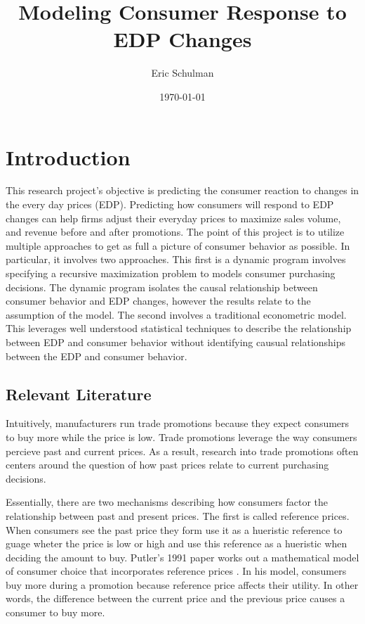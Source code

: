 \documentclass{article}
\title{Modeling Consumer Response to EDP Changes}
\author{Eric Schulman}
\date{\today}
\begin{document}
\maketitle

\section{Introduction}

This research project's objective is predicting the consumer reaction to changes in the every day prices (EDP). Predicting how consumers will respond to EDP changes can help firms adjust their everyday prices to maximize sales volume, and revenue before and after promotions. The point of this project is to utilize multiple approaches to get as full a picture of consumer behavior as possible. In particular, it involves two approaches. This first is a dynamic program involves specifying  a recursive maximization problem to models consumer purchasing decisions. The dynamic program isolates the causal relationship between consumer behavior and EDP changes, however the results relate to the assumption of the model. The second involves a traditional econometric model. This leverages well understood statistical techniques to describe the relationship between EDP and consumer behavior without identifying causual relationships between the EDP and consumer behavior.

\subsection{Relevant Literature}

Intuitively, manufacturers run trade promotions because they expect consumers to buy more while the price is low. Trade promotions leverage the way consumers percieve past and current prices. As a result, research into trade promotions often centers around the question of how past prices relate to current purchasing decisions.

Essentially, there are two mechanisms describing how consumers factor the relationship between past and present prices. The first is called reference prices. When consumers see the past price they form use it as a hueristic reference to guage wheter the price is low or high and use this reference as a hueristic when deciding the amount to buy. Putler's 1991 paper works out a mathematical model of consumer choice that incorporates reference prices \cite{putler}. In his model, consumers buy more during a promotion because reference price affects their utility. In other words, the difference between the current price and the previous price causes a consumer to buy more.
\end{document}
